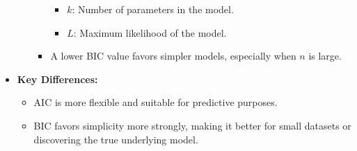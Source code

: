 \documentclass[11pt]{article}
\begin{document}
\begin{itemize}
\begin{itemize}
\begin{itemize}
\begin{itemize}
                      \item \(k\): Number of parameters in the model.
                      \item \(L\): Maximum likelihood of the model.
                  \end{itemize}
            \item A lower BIC value favors simpler models, especially when \(n\) is large.
        \end{itemize}
    \end{itemize}
    \item \textbf{Key Differences:}
    \begin{itemize}
        \item AIC is more flexible and suitable for predictive purposes.
        \item BIC favors simplicity more strongly, making it better for small datasets or discovering the true underlying model.
    \end{itemize}
\end{itemize}
\end{document}
